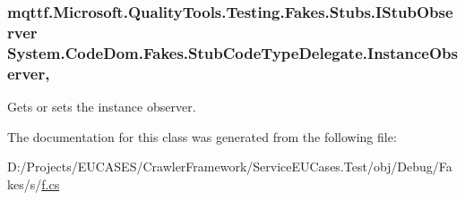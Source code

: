 \hypertarget{class_system_1_1_code_dom_1_1_fakes_1_1_stub_code_type_delegate_ad79455bb0e351b0034ba188ee2365abc}{
\subsubsection[{Instance\-Observer}]{\setlength{\rightskip}{0pt plus 5cm}mqttf.\-Microsoft.\-Quality\-Tools.\-Testing.\-Fakes.\-Stubs.\-I\-Stub\-Observer System.\-Code\-Dom.\-Fakes.\-Stub\-Code\-Type\-Delegate.\-Instance\-Observer\hspace{0.3cm}{\ttfamily [get]}, {\ttfamily [set]}}}\label{class_system_1_1_code_dom_1_1_fakes_1_1_stub_code_type_delegate_ad79455bb0e351b0034ba188ee2365abc}


Gets or sets the instance observer.



The documentation for this class was generated from the following file\-:\begin{DoxyCompactItemize}
\item 
D\-:/\-Projects/\-E\-U\-C\-A\-S\-E\-S/\-Crawler\-Framework/\-Service\-E\-U\-Cases.\-Test/obj/\-Debug/\-Fakes/s/\hyperlink{s_2f_8cs}{f.\-cs}\end{DoxyCompactItemize}
